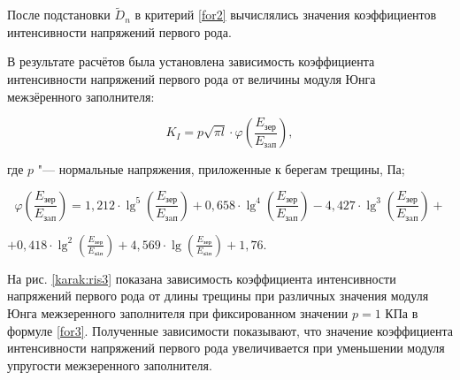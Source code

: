 После подстановки $\tilde{D}_{n}$ в критерий \eqref{for2} вычислялись значения коэффициентов интенсивности напряжений первого рода.

В результате расчётов была установлена зависимость коэффициента интенсивности напряжений первого рода от величины модуля Юнга межзёренного заполнителя:

\begin{equation}

\label{for3}

K_{I}=p\sqrt{\pi l}\cdot\varphi\left(\frac{E_{\text{зер}}} {E_{\text{зaп}}} \right),

\end{equation}

где $p$ "--- нормальные напряжения, приложенные к берегам трещины, Па;

$$\varphi\left(\frac{E_{\text{зер}}} {E_{\text{зaп}}} \right)=1,212\cdot\lg^5\left(\frac{E_{\text{зер}}} {E_{\text{зaп}}} \right)+0,658\cdot\lg^4\left(\frac{E_{\text{зер}}} {E_{\text{зaп}}} \right)-4,427\cdot\lg^3\left(\frac{E_{\text{зер}}} {E_{\text{зaп}}} \right)+$$ 

\begin{flushright}

$+0,418\cdot\lg^2\left(\frac{E_{\text{зер}}} {E_{\text{зaп}}} \right)+4,569\cdot\lg\left(\frac{E_{\text{зер}}} {E_{\text{зaп}}} \right)+1,76.$

\end{flushright}



На рис. \ref{karak:ris3} показана зависимость коэффициента интенсивности напряжений первого рода от длины трещины при различных значения модуля Юнга межзеренного заполнителя при фиксированном значении $p=1$ КПа в формуле \eqref{for3}. Полученные зависимости показывают, что значение коэффициента интенсивности напряжений первого рода увеличивается при уменьшении модуля упругости межзеренного заполнителя.







%






